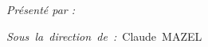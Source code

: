 \begin{multicols}{2}
	\vspace*{\fill}
	\begin{flushleft}
	
	
		\begin{minipage}{0.7\textwidth} %
			\textit{Présenté par :} \@author
		\end{minipage}
		
		\mbox{\textit{Sous la direction de :} Claude MAZEL}
		
		
	\end{flushleft}
\columnbreak
	\vspace*{\fill}
	
	\begin{flushright}
	
		
		\@date
		
		
	\end{flushright}
\end{multicols}



\makeatother %
